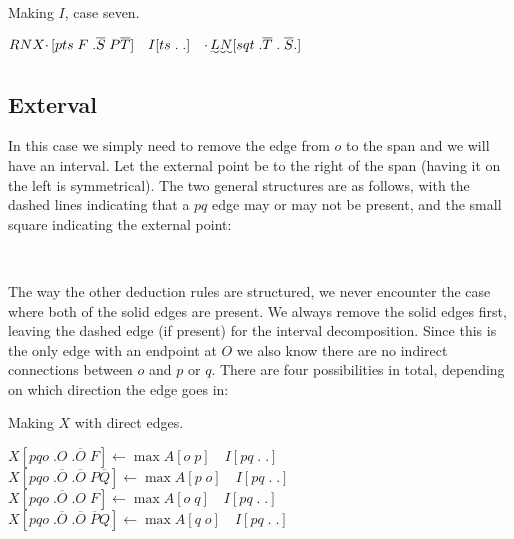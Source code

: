 \begin{finalEquation}
\caption{Making $I$, case seven.}
  $RNX\cdotp [pts \; F \; .\overline{S} \; P\overline{T}] \quad I[ts \; . \; .] \quad \cdotp \uwave{LN}[sqt \; .\overline{T} \; . \; \overline{S}.]$
\end{finalEquation}

\subsection{Exterval}
In this case we simply need to remove the edge from $o$ to the span and we will have an interval.
Let the external point be to the right of the span (having it on the left is symmetrical).
The two general structures are as follows, with the dashed lines indicating that a $pq$ edge may or may not be present, and the small square indicating the external point:

\begin{center}
\\
\end{center}

The way the other deduction rules are structured, we never encounter the case where both of the solid edges are present.
We always remove the solid edges first, leaving the dashed edge (if present) for the interval decomposition.
Since this is the only edge with an endpoint at $O$ we also know there are no indirect connections between $o$ and $p$ or $q$.
There are four possibilities in total, depending on which direction the edge goes in:

\begin{finalEquation}
\caption{Making $X$ with direct edges.}
  $X[pqo \; .O \; .\overline{O} \; F] \leftarrow \max A[o \; p] \quad I[pq \; . \; .]$ \\
  $X[pqo \; .\overline{O} \; .\overline{O} \; P\overline{Q}] \leftarrow \max  A[p \; o] \quad I[pq \; . \; .]$ \\
  $X[pqo \; .\overline{O} \; .O \; F] \leftarrow \max A[o \; q] \quad I[pq \; . \; .]$ \\
  $X[pqo \; .\overline{O} \; .\overline{O} \; \overline{P}Q] \leftarrow \max A[q \; o] \quad I[pq \; . \; .]$
\end{finalEquation}

